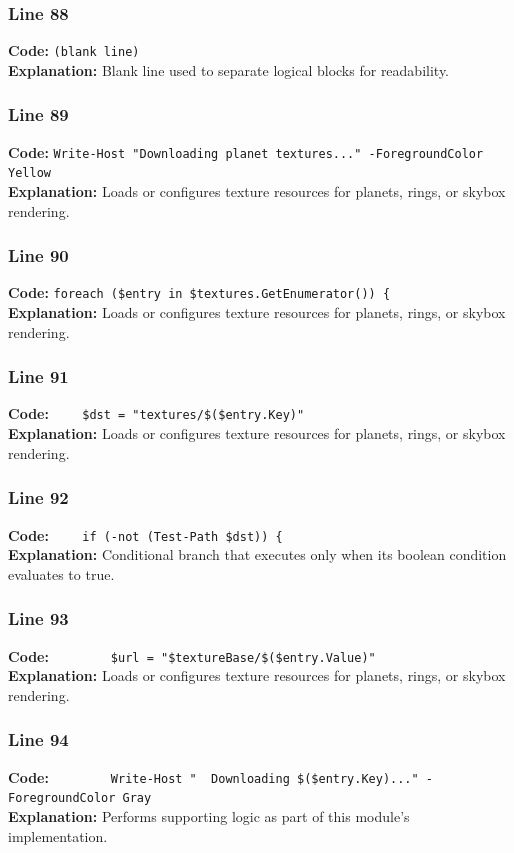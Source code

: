 \documentclass[11pt,a4paper]{article}
\begin{document}
\subsubsection*{Line 88}
\textbf{Code:} \texttt{(blank line)}\\
\textbf{Explanation:} Blank line used to separate logical blocks for readability.

\subsubsection*{Line 89}
\textbf{Code:} \verb|Write-Host "Downloading planet textures..." -ForegroundColor Yellow|\\
\textbf{Explanation:} Loads or configures texture resources for planets, rings, or skybox rendering.

\subsubsection*{Line 90}
\textbf{Code:} \verb|foreach ($entry in $textures.GetEnumerator()) {|\\
\textbf{Explanation:} Loads or configures texture resources for planets, rings, or skybox rendering.

\subsubsection*{Line 91}
\textbf{Code:} \verb|    $dst = "textures/$($entry.Key)"|\\
\textbf{Explanation:} Loads or configures texture resources for planets, rings, or skybox rendering.

\subsubsection*{Line 92}
\textbf{Code:} \verb|    if (-not (Test-Path $dst)) {|\\
\textbf{Explanation:} Conditional branch that executes only when its boolean condition evaluates to true.

\subsubsection*{Line 93}
\textbf{Code:} \verb|        $url = "$textureBase/$($entry.Value)"|\\
\textbf{Explanation:} Loads or configures texture resources for planets, rings, or skybox rendering.

\subsubsection*{Line 94}
\textbf{Code:} \verb|        Write-Host "  Downloading $($entry.Key)..." -ForegroundColor Gray|\\
\textbf{Explanation:} Performs supporting logic as part of this module's implementation.
\end{document}
